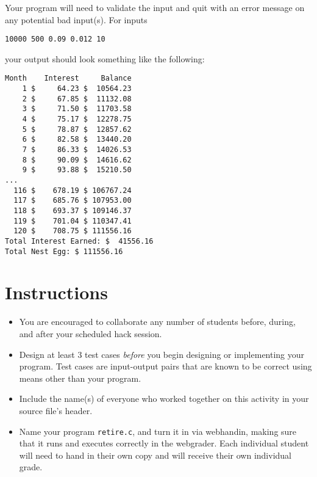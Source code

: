 \documentclass[12pt]{scrartcl}
\begin{document}
Your program will need to validate the input and quit with an error
message on any potential bad input(s).  For inputs 

\texttt{10000 500 0.09 0.012 10} 

your output should look something like the following:

\begin{verbatim}
Month    Interest     Balance 
    1 $     64.23 $  10564.23
    2 $     67.85 $  11132.08
    3 $     71.50 $  11703.58
    4 $     75.17 $  12278.75
    5 $     78.87 $  12857.62
    6 $     82.58 $  13440.20
    7 $     86.33 $  14026.53
    8 $     90.09 $  14616.62
    9 $     93.88 $  15210.50
...    
  116 $    678.19 $ 106767.24
  117 $    685.76 $ 107953.00
  118 $    693.37 $ 109146.37
  119 $    701.04 $ 110347.41
  120 $    708.75 $ 111556.16
Total Interest Earned: $  41556.16
Total Nest Egg: $ 111556.16
\end{verbatim}

\section*{Instructions}

\begin{itemize}
  \item You are encouraged to collaborate any number of students 
  before, during, and after your scheduled hack session.  
  \item Design at least 3 test cases \emph{before} you begin
  designing or implementing your program.  Test cases are 
  input-output pairs that are known to be correct using means
  other than your program.
  \item Include the name(s) of everyone who worked together on
  this activity in your source file's header.
  \item Name your program \texttt{retire.c}, and
  turn it in via webhandin, making sure that it runs and executes
  correctly in the webgrader.  Each individual student will need
  to hand in their own copy and will receive their own individual
  grade.
\end{itemize}
  
\end{document}
